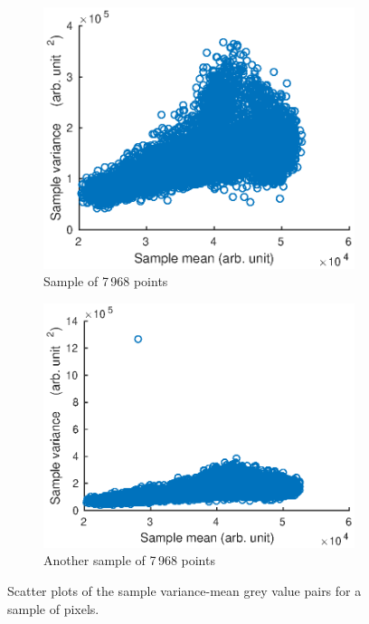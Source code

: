 \documentclass[12pt]{report}
\begin{document}
\begin{figure}
	\centering
	\begin{subfigure}[b]{0.45\textwidth}
		\includegraphics[width=1\textwidth]{figures/meanVar/scatter1.eps}
		\caption{Sample of 7\,968 points}
	\end{subfigure}
	\begin{subfigure}[b]{0.45\textwidth}
		\includegraphics[width=1\textwidth]{figures/meanVar/scatter2.eps}
		\caption{Another sample of 7\,968 points}
	\end{subfigure}
	\caption{Scatter plots of the sample variance-mean grey value pairs for a sample of pixels.}
	\label{fig:scatterMeanVar}
\end{figure}
\end{document}
